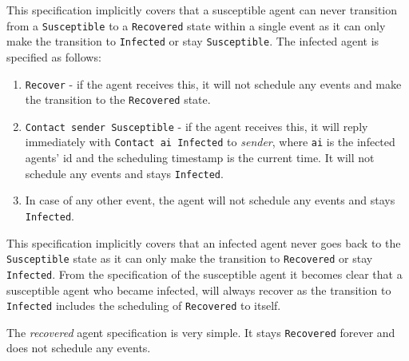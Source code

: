 This specification implicitly covers that a susceptible agent can never transition from a \texttt{Susceptible} to a \texttt{Recovered} state within a single event as it can only make the transition to \texttt{Infected} or stay \texttt{Susceptible}. The infected agent is specified as follows:

\begin{enumerate}
	\item \texttt{Recover} - if the agent receives this, it will not schedule any events and make the transition to the \texttt{Recovered} state.
	
	\item \texttt{Contact sender Susceptible} - if the agent receives this, it will reply immediately with \texttt{Contact ai Infected} to \textit{sender}, where \texttt{ai} is the infected agents' id and the scheduling timestamp is the current time. It will not schedule any events and stays \texttt{Infected}.
	
	\item In case of any other event, the agent will not schedule any events and stays \texttt{Infected}.
\end{enumerate}

This specification implicitly covers that an infected agent never goes back to the \texttt{Susceptible} state as it can only make the transition to \texttt{Recovered} or stay \texttt{Infected}. From the specification of the susceptible agent it becomes clear that a susceptible agent who became infected, will always recover as the transition to \texttt{Infected} includes the scheduling of \texttt{Recovered} to itself. 

\medskip

The \textit{recovered} agent specification is very simple. It stays \texttt{Recovered} forever and does not schedule any events.